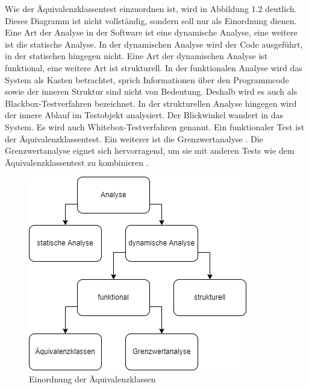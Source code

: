 Wie der Äquivalenzklassentest einzuordnen ist, wird in Abbildung 1.2 deutlich.
Dieses Diagramm ist nicht vollständig, sondern soll nur als Einordnung dienen.
Eine Art der Analyse in der Software ist eine dynamische Analyse, eine weitere ist die statische Analyse.
In der dynamischen Analyse
wird der Code ausgeführt, in der statischen hingegen nicht. Eine Art der dynamischen Analyse ist funktional, eine weitere Art ist strukturell.
In der funktionalen Analyse wird das System als Kasten betrachtet, sprich Informationen über den Programmcode sowie
der inneren Struktur sind nicht von Bedeutung. Deshalb wird es auch als Blackbox-Testverfahren bezeichnet.
In der strukturellen Analyse hingegen wird der innere Ablauf im Testobjekt analysiert. Der Blickwinkel wandert
in das System. Es wird auch Whitebox-Testverfahren genannt.
Ein funktionaler Test ist der Äquivalenzklassentest. 
Ein weiterer ist die Grenzwertanalyse \parencite[S. 114 ff.]{equiinformatic}\parencite[]{dynamischeanalyse1}\parencite[]{dynamischeanalyse2}.
Die Grenzwertanalyse eignet sich hervorragend, um sie mit anderen Tests wie dem Äquivalenzklassentest 
zu kombinieren \parencite[S. 36]{integration}.\par
\begin{figure}[h]
\centering
\includegraphics[scale=0.9,]{Bilder/Einordnung.drawio.png}
\caption{Einordnung der Äquivalenzklassen \parencite[]{dynamischeanalyse1}\parencite[]{dynamischeanalyse2}\parencite[S. 114 ff.]{equiinformatic}}
\end{figure}





